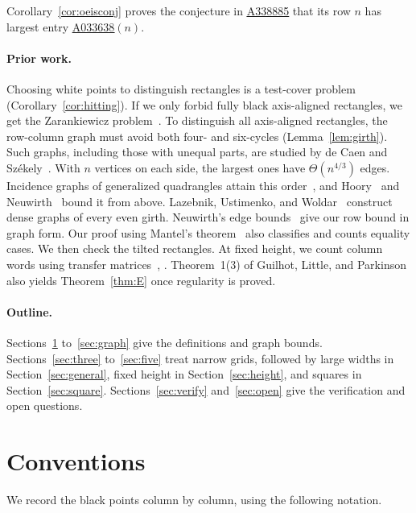 \documentclass[12pt]{article}
\theoremstyle{plain}
\theoremstyle{definition}
\theoremstyle{remark}
\newcommand{\seqnum}[1]{\href{https://oeis.org/#1}{\rm \underline{#1}}}
\begin{document}
Corollary~\ref{cor:oeisconj} proves the conjecture in \seqnum{A338885} that its row $n$ has
largest entry \seqnum{A033638}$(n)$.

\paragraph{Prior work.} Choosing white points to distinguish rectangles is
a test-cover problem~\cite{bellitto2018,foucaud2015,katona1966,moretshapiro1985}
(Corollary~\ref{cor:hitting}). If we only forbid fully black axis-aligned
rectangles, we get the Zarankiewicz problem~\cite{furedi1996,kst1954,reiman1958}.
To distinguish all axis-aligned rectangles, the row-column graph must
avoid both four- and six-cycles (Lemma~\ref{lem:girth}). Such graphs,
including those with unequal parts, are studied by de Caen and
Sz\'ekely~\cite{decaenszekely1992,decaenszekely1997}. With $n$ vertices on each
side, the largest ones have $\Theta(n^{4/3})$ edges. Incidence graphs of generalized
quadrangles attain this order~\cite{benson1966}, and Hoory~\cite{hoory2002} and
Neuwirth~\cite{neuwirth2001} bound it from above. Lazebnik, Ustimenko, and
Woldar~\cite{lazebnik1995} construct dense graphs of every even girth.
Neuwirth's edge bounds~\cite[Theorem~1(ii) and Proposition~17]{neuwirth2001}
give our row bound in graph form. Our proof using Mantel's theorem~\cite{mantel1907}
also classifies and counts equality cases. We then check the tilted rectangles.
At fixed height, we count column words using transfer
matrices~\cite{alanko2011,euler2005,mertens2024},
\cite[Proposition~V.6]{flajolet2009}.
Theorem~1(3) of Guilhot, Little, and Parkinson~\cite{glp2025} also
yields Theorem~\ref{thm:E} once regularity is proved.

\paragraph{Outline.} Sections~\ref{sec:conv} to~\ref{sec:graph} give the definitions
and graph bounds. Sections~\ref{sec:three} to~\ref{sec:five} treat narrow grids,
followed by large widths in Section~\ref{sec:general}, fixed height in
Section~\ref{sec:height}, and squares in Section~\ref{sec:square}.
Sections~\ref{sec:verify} and~\ref{sec:open} give the verification and open questions.
\section{Conventions}\label{sec:conv}

We record the black points column by column, using the following notation.
\end{document}
